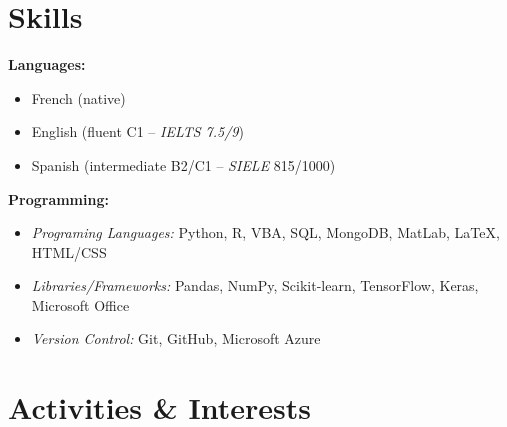 \documentclass[a4paper,9pt]{extarticle}
\begin{document}
\section*{\faCogs \hspace{0.1em} Skills}

\noindent
\begin{minipage}[t]{0.45\textwidth} %
    \textbf{Languages:}
    \begin{itemize}
        \item French (native)
        \item English (fluent C1 -- \textit{IELTS 7.5/9})
        \item Spanish (intermediate B2/C1 -- \textit{SIELE} 815/1000)
    \end{itemize}
\end{minipage}%
\hfill %
\begin{minipage}[t]{0.45\textwidth} %
    \textbf{Programming:}
    \begin{itemize}
        \item \textit{Programing Languages:} Python, R, VBA, SQL, MongoDB, MatLab, LaTeX, HTML/CSS
        \item \textit{Libraries/Frameworks:} Pandas, NumPy, Scikit-learn, TensorFlow, Keras, Microsoft Office
        \item \textit{Version Control:} Git, GitHub, Microsoft Azure
    \end{itemize}
\end{minipage}

\vspace{6pt}

\section*{\faHeart \hspace{0.1em} Activities \& Interests}
\end{document}
